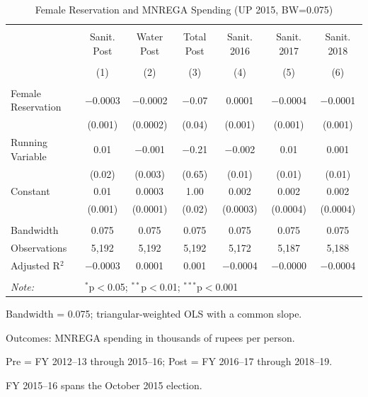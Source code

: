 \begin{table}
\centering
\begin{threeparttable}

  \caption{Female Reservation and MNREGA Spending (UP 2015, BW=0.075)} 
  \label{tab:mnrega_up_cdm_bw075} 
\scriptsize 
\begin{tabular}{@{\extracolsep{0pt}}lcccccc} 
\\[-1.8ex]\hline 
\hline \\[-1.8ex] 
 & Sanit. Post & Water Post & Total Post & Sanit. 2016 & Sanit. 2017 & Sanit. 2018 \\ 
\\[-1.8ex] & (1) & (2) & (3) & (4) & (5) & (6)\\ 
\hline \\[-1.8ex] 
 Female Reservation & $-$0.0003 & $-$0.0002 & $-$0.07 & 0.0001 & $-$0.0004 & $-$0.0001 \\ 
  & (0.001) & (0.0002) & (0.04) & (0.001) & (0.001) & (0.001) \\ 
  Running Variable & 0.01 & $-$0.001 & $-$0.21 & $-$0.002 & 0.01 & 0.001 \\ 
  & (0.02) & (0.003) & (0.65) & (0.01) & (0.01) & (0.01) \\ 
  Constant & 0.01 & 0.0003 & 1.00 & 0.002 & 0.002 & 0.002 \\ 
  & (0.001) & (0.0001) & (0.02) & (0.0003) & (0.0004) & (0.0004) \\ 
 \hline \\[-1.8ex] 
Bandwidth & 0.075 & 0.075 & 0.075 & 0.075 & 0.075 & 0.075 \\ 
Observations & 5,192 & 5,192 & 5,192 & 5,172 & 5,187 & 5,188 \\ 
Adjusted R$^{2}$ & $-$0.0003 & 0.0001 & 0.001 & $-$0.0004 & $-$0.0000 & $-$0.0004 \\ 
\hline 
\hline \\[-1.8ex] 
\textit{Note:}  & \multicolumn{6}{l}{$^{*}$p$<$0.05; $^{**}$p$<$0.01; $^{***}$p$<$0.001} \\ 
\end{tabular} 
\begin{tablenotes}[flushleft]
\setlength{\itemindent}{0em}
\scriptsize
\item[] Bandwidth = 0.075; triangular-weighted OLS with a common slope.
\item[] Outcomes: MNREGA spending in thousands of rupees per person.
\item[] Pre = FY 2012--13 through 2015--16; Post = FY 2016--17 through 2018--19.
\item[] FY 2015--16 spans the October 2015 election.

\end{tablenotes}
\end{threeparttable}
\end{table}
